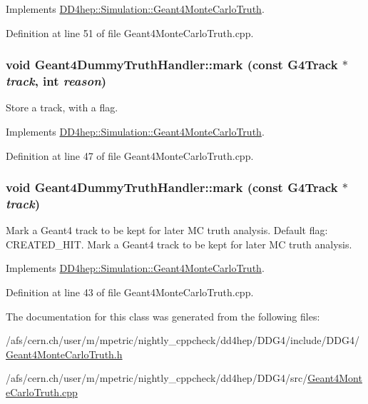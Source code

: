 Implements \hyperlink{class_d_d4hep_1_1_simulation_1_1_geant4_monte_carlo_truth_a6aa3674a7c9e2f0132251bf05c7dab88}{DD4hep::Simulation::Geant4MonteCarloTruth}.

Definition at line 51 of file Geant4MonteCarloTruth.cpp.\hypertarget{class_d_d4hep_1_1_simulation_1_1_geant4_dummy_truth_handler_aa5a1b21c7557cd4dfb314b217fc37a87}{
\subsubsection[{mark}]{\setlength{\rightskip}{0pt plus 5cm}void Geant4DummyTruthHandler::mark (const G4Track $\ast$ {\em track}, \/  int {\em reason})}}
\label{class_d_d4hep_1_1_simulation_1_1_geant4_dummy_truth_handler_aa5a1b21c7557cd4dfb314b217fc37a87}


Store a track, with a flag. 

Implements \hyperlink{class_d_d4hep_1_1_simulation_1_1_geant4_monte_carlo_truth_a6b63ab3d0ac424aba1088fb9ea2994dc}{DD4hep::Simulation::Geant4MonteCarloTruth}.

Definition at line 47 of file Geant4MonteCarloTruth.cpp.\hypertarget{class_d_d4hep_1_1_simulation_1_1_geant4_dummy_truth_handler_ae7540d20113834f5a31134df344813ad}{
\subsubsection[{mark}]{\setlength{\rightskip}{0pt plus 5cm}void Geant4DummyTruthHandler::mark (const G4Track $\ast$ {\em track})}}
\label{class_d_d4hep_1_1_simulation_1_1_geant4_dummy_truth_handler_ae7540d20113834f5a31134df344813ad}


Mark a Geant4 track to be kept for later MC truth analysis. Default flag: CREATED\_\-HIT. Mark a Geant4 track to be kept for later MC truth analysis. 

Implements \hyperlink{class_d_d4hep_1_1_simulation_1_1_geant4_monte_carlo_truth_ad74253c38fb6e00003b591a07e5e748d}{DD4hep::Simulation::Geant4MonteCarloTruth}.

Definition at line 43 of file Geant4MonteCarloTruth.cpp.

The documentation for this class was generated from the following files:\begin{DoxyCompactItemize}
\item 
/afs/cern.ch/user/m/mpetric/nightly\_\-cppcheck/dd4hep/DDG4/include/DDG4/\hyperlink{_geant4_monte_carlo_truth_8h}{Geant4MonteCarloTruth.h}\item 
/afs/cern.ch/user/m/mpetric/nightly\_\-cppcheck/dd4hep/DDG4/src/\hyperlink{_geant4_monte_carlo_truth_8cpp}{Geant4MonteCarloTruth.cpp}\end{DoxyCompactItemize}
